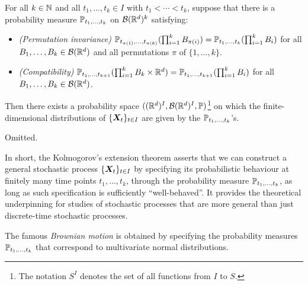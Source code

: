 \begin{enumerate}
\begin{theorem}
\label{thm:kolmogorov-extension}
For all \(k\in\mathbb{N}\) and all \(t_1,\dotsc,t_k\in I\) with \(t_1<\dotsb<t_k\),
suppose that there is a probability measure \(\mathbb{P}_{t_1,\dotsc,t_k}\) on
\(\mathcal{B}(\mathbb{R}^d)^{k}\) satisfying:
\begin{itemize}
\item \emph{(Permutation invariance)} \(\mathbb{P}_{t_{\pi(1)},\dotsc,t_{\pi(k)}}(\prod_{i=1}^{k}B_{\pi(i)})
=\mathbb{P}_{t_1,\dotsc,t_k}(\prod_{i=1}^{k}B_i)\) for all
\(B_1,\dotsc,B_k\in\mathcal{B}(\mathbb{R}^d)\) and all permutations \(\pi\) of \(\{1,\dotsc,k\}\).
\item \emph{(Compatibility)} \(\mathbb{P}_{t_1,\dotsc,t_{k+1}}(\prod_{i=1}^{k}B_k\times\mathbb{R}^d)
=\mathbb{P}_{t_1,\dotsc,t_{k+1}}(\prod_{i=1}^{k}B_i)\) for all
\(B_1,\dotsc,B_k\in\mathcal{B}(\mathbb{R}^d)\).
\end{itemize}
Then there exists a probability space
\(((\mathbb{R}^d)^{I},\mathcal{B}(\mathbb{R}^d)^{I},\mathbb{P})\)\footnote{The notation \(S^I\)
denotes the set of all functions from \(I\) to \(S\).} on which the
finite-dimensional distributions of \(\{\bm{X}_t\}_{t\in I}\) are given by
the \(\mathbb{P}_{t_1,\dotsc,t_k}\)'s.
\end{theorem}
\begin{pf}
Omitted.
\end{pf}

In short, the Kolmogorov's extension theorem asserts that we can construct a
general stochastic process \(\{\bm{X}_t\}_{t\in I}\) by specifying its
probabilistic behaviour at finitely many time points \(t_1,\dotsc,t_k\),
through the probability measure \(\mathbb{P}_{t_1,\dotsc,t_k}\), as long as such
specification is sufficiently ``well-behaved''. It provides the theoretical
underpinning for studies of stochastic processes that are more general than
just discrete-time stochastic processes.
\begin{note}
The famous \emph{Brownian motion} is obtained by specifying the probability
measures \(\mathbb{P}_{t_1,\dotsc,t_k}\) that correspond to multivariate normal
distributions.
\end{note}
\end{enumerate}
